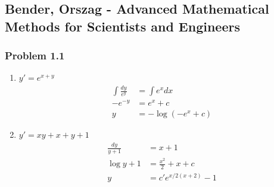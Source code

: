 \documentclass[10pt,a4paper]{article}
\theoremstyle{definition}
\begin{document}
\subsection{{\sc Bender, Orszag} - Advanced Mathematical Methods for Scientists and Engineers}
\subsubsection{Problem 1.1}
\begin{enumerate}
    \item $y'=e^{x+y}$
    \begin{align}
        \int\frac{dy}{e^y}&=\int e^xdx\\
        -e^{-y}&=e^x+c\\
        y&=-\log\left(-e^x+c\right)
    \end{align}
    \item $y'=xy+x+y+1$
    \begin{align}
        \frac{dy}{y+1}&=x+1\\
        \log y+1&=\frac{x^2}{2}+x+c\\
        y&=c'e^{x/2(x+2)}-1
    \end{align}
\end{enumerate}
\end{document}

